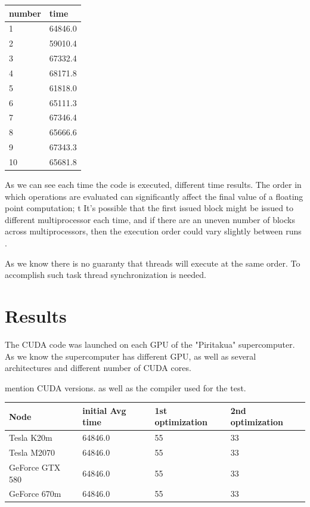 \begin{table}[h]
\centering
  \begin{tabular} { |  l  |  l  |  }
    \hline
    number & time  \\
    \hline
    1 &  64846.0 \\
   \hline
    2 & 59010.4 \\
   \hline
    3 & 67332.4\\
   \hline
    4 & 68171.8 \\
   \hline
    5 & 61818.0 \\
   \hline
    6 & 65111.3\\
    \hline
    7 &  67346.4\\
    \hline
    8 & 65666.6 \\
    \hline
    9 & 67343.3 \\
    \hline
    10 & 65681.8      \\
   \hline
  \end{tabular}
  \end{table}
  
As we can see each time the code is executed, different time results. The order in which operations are evaluated can significantly affect the final value of a floating point computation; t
It's possible that the first issued block might be issued to different multiprocessor each time, and if there are an uneven number of blocks across multiprocessors, then the execution order could vary slightly between runs \cite{cook}.

As we know there is no guaranty that threads will execute at the same order. To accomplish such task thread synchronization is needed.




\section{Results}

The CUDA code was launched on each GPU of the "Piritakua" supercomputer. As we know the supercomputer has different GPU, as well as several architectures and different number of CUDA cores.


mention CUDA versions. as well as the compiler used for the test.


\begin{table}[h]
\centering
  \begin{tabular} { |  l  |  l  |  l  | l |}
    \hline
    Node & initial Avg time & 1st optimization & 2nd optimization \\
    \hline
    Tesla K20m &  64846.0 & 55 & 33\\
   \hline
    Tesla M2070 & 64846.0 & 55 & 33\\
   \hline
    GeForce GTX 580 & 64846.0 & 55 & 33\\
   \hline
    GeForce 670m & 64846.0 & 55 & 33\\
   \hline
  \end{tabular}
  \end{table}
  
